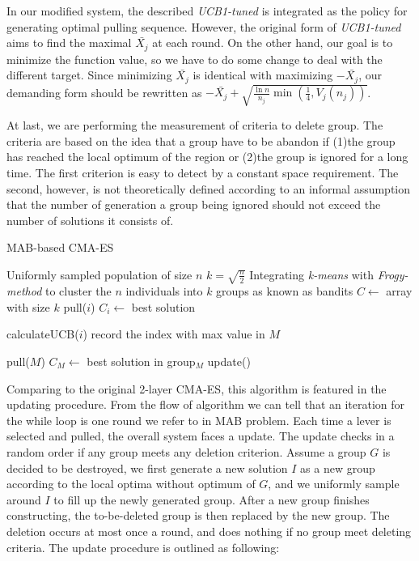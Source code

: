 In our modified system, the described \emph{UCB1-tuned} is integrated as
the policy for generating optimal pulling sequence.
However, the original form of \emph{UCB1-tuned} aims to find the maximal
$\bar{X_j}$ at each round.
On the other hand, our goal is to minimize the function value, so we
have to do some change to deal with the different target.
Since minimizing $\bar{X_j}$ is identical with maximizing $-\bar{X_j}$,
our demanding form should be rewritten as $ -\bar{X_j}
+\sqrt{\frac{\ln{n}}{n_j} \min(\frac{1}{4},V_j(n_j))}$.		

At last, we are performing the measurement of criteria to delete group.
The criteria are based on the idea that a group have to be abandon if
(1)the group has reached the local optimum of the region or (2)the group
is ignored for a long time.
The first criterion is easy to detect by a constant space requirement.
The second, however, is not theoretically defined according to an
informal assumption that the number of generation a group being ignored
should not exceed the number of solutions it consists of.




\begin{algorithm}[H] \caption{MAB-based CMA-ES} 
	 Uniformly sampled population of
	size $n$\; $k = \sqrt{\frac{n}{2}}$\; Integrating \emph{k-means}
	with \emph{Frogy-method} to cluster the $n$ individuals into $k$
	groups as known as bandits\; $C\leftarrow$ array with size $k$\;
	            { pull($i$)\; $C_i\leftarrow$ best
	solution\; }  {  {
			calculateUCB($i$)  record the index with max value in $M$\;

		} pull($M$)\;				$C_M \leftarrow$ best solution in
	group$_M$\; update()\; }
\end{algorithm}	

Comparing to the original 2-layer CMA-ES, this algorithm is featured in the
updating procedure.  From the flow of algorithm we can tell that an iteration
for the while loop is one round we refer to in MAB problem.  Each time a lever
is selected and pulled, the overall system faces a update. The
update checks in a random order if
any group meets any deletion criterion.  Assume a group $G$ is decided to be
destroyed,  we first generate a new solution $I$ as  a new group according to the local
optima without optimum of $G$, and we uniformly sample around $I$ to fill up the newly generated
group.  After a new group finishes constructing, the to-be-deleted group is then
replaced by the new group. The deletion occurs at most once a round,
and does nothing if no group meet deleting criteria. The update
procedure is outlined as following:

